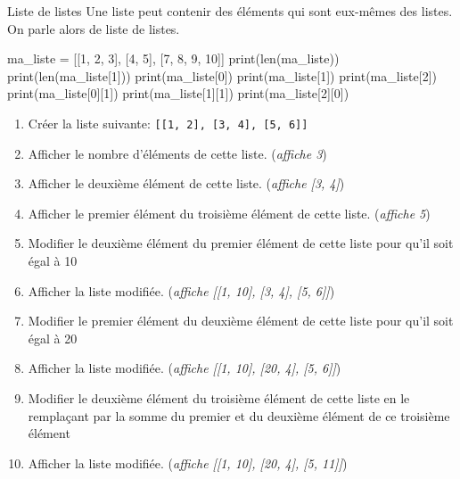 \begin{easybox}{Liste de listes}{}
	Une liste peut contenir des éléments qui sont eux-mêmes des listes. On parle alors de liste de listes.

		\begin{ConsolePythontex}[Label=false]{}
ma_liste = [[1, 2, 3], [4, 5], [7, 8, 9, 10]]
print(len(ma_liste))
print(len(ma_liste[1]))
print(ma_liste[0])
print(ma_liste[1])
print(ma_liste[2])
print(ma_liste[0][1])
print(ma_liste[1][1])
print(ma_liste[2][0])
		\end{ConsolePythontex}

		

\end{easybox}

\begin{exercice_cours}{}
	\begin{enumerate}
		\item Créer la liste suivante: \verb|[[1, 2], [3, 4], [5, 6]]|
		\item Afficher le nombre d'éléments de cette liste. (\emph{affiche 3})
		\item Afficher le deuxième élément de cette liste. (\emph{affiche [3, 4]})
		\item Afficher le premier élément du troisième élément de cette liste. (\emph{affiche 5})
		\item Modifier le deuxième élément du premier élément de cette liste pour qu'il soit égal à 10
		\item Afficher la liste modifiée. (\emph{affiche [[1, 10], [3, 4], [5, 6]]})
		\item Modifier le premier élément du deuxième élément de cette liste pour qu'il soit égal à 20
		\item Afficher la liste modifiée. (\emph{affiche [[1, 10], [20, 4], [5, 6]]})	
		\item Modifier le deuxième élément du troisième élément de cette liste en le remplaçant par la somme du premier et du deuxième élément de ce troisième élément
		\item Afficher la liste modifiée. (\emph{affiche [[1, 10], [20, 4], [5, 11]]})
	\end{enumerate}
\end{exercice_cours}

\pagebreak


